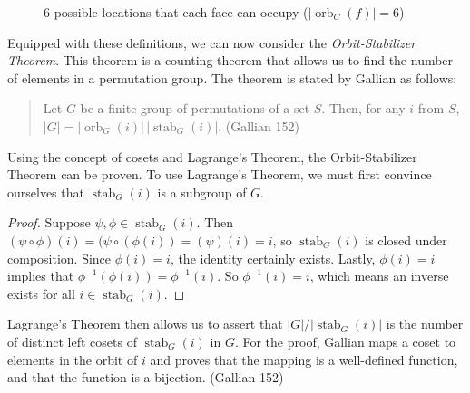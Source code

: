 \documentclass[11pt,twoside]{article}
\begin{document}
\begin{figure}[H]
\begin{tikzpicture}[thick,scale=1.5]
\end{tikzpicture}\quad
{}
\caption{6 possible locations that each face can occupy ($|\operatorname{orb}_{C}(f)| = 6$)}
\label{orb}
\end{figure}

Equipped with these definitions, we can now consider the \emph{Orbit-Stabilizer Theorem}.  This theorem is a counting theorem that allows us to find the number of elements in a permutation group.  The theorem is stated by Gallian as follows:
\begin{quote}
Let $G$ be a finite group of permutations of a set $S$.  Then, for any $i$ from $S$, $|G| = |\operatorname{orb}_G(i)|\,|\operatorname{stab}_G(i)|$. (Gallian 152)
\end{quote}

Using the concept of cosets and Lagrange's Theorem, the Orbit-Stabilizer Theorem can be proven.  To use Lagrange's Theorem, we must first convince ourselves that $\operatorname{stab}_G(i)$ is a subgroup of $G$.
\begin{proof}
Suppose $\psi, \phi \in \operatorname{stab}_G(i)$.  Then $(\psi \circ \phi)(i) = (\psi \circ (\phi(i)) =  (\psi)(i) = i$, so $\operatorname{stab}_G(i)$ is closed under composition.  Since $\phi(i) = i$, the identity certainly exists.  Lastly, $\phi(i) = i$ implies that $\phi^{-1}(\phi(i)) = \phi^{-1}(i)$.   So $\phi^{-1}(i) = i$, which means an inverse exists for all $i\in \operatorname{stab}_G(i)$.
\end{proof}
Lagrange's Theorem then allows us to assert that $|G|/|\operatorname{stab}_G(i)|$ is the number of distinct left cosets of $\operatorname{stab}_G(i)$ in $G$.  For the proof, Gallian maps a coset to elements in the orbit of $i$ and proves that the mapping is a well-defined function, and that the function is a bijection. (Gallian 152)
\end{document}
